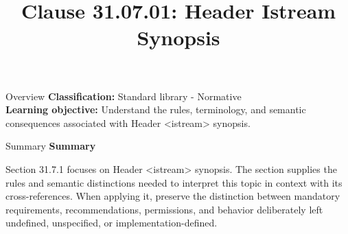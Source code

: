 \documentclass[10pt,letterpaper]{article}
\title{Clause 31.07.01: Header Istream Synopsis}
\author{}
\date{}
\begin{document}
\maketitle
\begin{CornellOverviewBox}{Overview}
\textbf{Classification:} Standard library - Normative\\[2pt]
\textbf{Learning objective:} Understand the rules, terminology, and semantic consequences associated with Header <istream> synopsis.
\end{CornellOverviewBox}\begin{CornellSummaryBox}{Summary}
{\sffamily\bfseries\color{Accent} Summary}\par\vspace{3pt}Section 31.7.1 focuses on Header <istream> synopsis. The section supplies the rules and semantic distinctions needed to interpret this topic in context with its cross-references. When applying it, preserve the distinction between mandatory requirements, recommendations, permissions, and behavior deliberately left undefined, unspecified, or implementation-defined.
\end{CornellSummaryBox}
\end{document}

